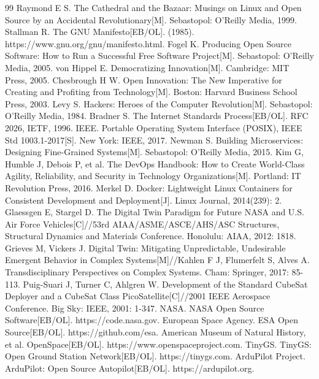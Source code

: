 \documentclass[UTF8,a4paper,zihao=-4]{ctexart}
\begin{document}
\begin{thebibliography}{99}
 Raymond E S. The Cathedral and the Bazaar: Musings on Linux and Open Source by an Accidental Revolutionary[M]. Sebastopol: O'Reilly Media, 1999.
 Stallman R. The GNU Manifesto[EB/OL]. (1985). https://www.gnu.org/gnu/manifesto.html.
 Fogel K. Producing Open Source Software: How to Run a Successful Free Software Project[M]. Sebastopol: O'Reilly Media, 2005.
 von Hippel E. Democratizing Innovation[M]. Cambridge: MIT Press, 2005.
 Chesbrough H W. Open Innovation: The New Imperative for Creating and Profiting from Technology[M]. Boston: Harvard Business School Press, 2003.
 Levy S. Hackers: Heroes of the Computer Revolution[M]. Sebastopol: O'Reilly Media, 1984.
 Bradner S. The Internet Standards Process[EB/OL]. RFC 2026, IETF, 1996.
 IEEE. Portable Operating System Interface (POSIX), IEEE Std 1003.1-2017[S]. New York: IEEE, 2017.
 Newman S. Building Microservices: Designing Fine-Grained Systems[M]. Sebastopol: O'Reilly Media, 2015.
 Kim G, Humble J, Debois P, et al. The DevOps Handbook: How to Create World-Class Agility, Reliability, and Security in Technology Organizations[M]. Portland: IT Revolution Press, 2016.
 Merkel D. Docker: Lightweight Linux Containers for Consistent Development and Deployment[J]. Linux Journal, 2014(239): 2.
 Glaessgen E, Stargel D. The Digital Twin Paradigm for Future NASA and U.S. Air Force Vehicles[C]//53rd AIAA/ASME/ASCE/AHS/ASC Structures, Structural Dynamics and Materials Conference. Honolulu: AIAA, 2012: 1818.
 Grieves M, Vickers J. Digital Twin: Mitigating Unpredictable, Undesirable Emergent Behavior in Complex Systems[M]//Kahlen F J, Flumerfelt S, Alves A. Transdisciplinary Perspectives on Complex Systems. Cham: Springer, 2017: 85-113.
 Puig-Suari J, Turner C, Ahlgren W. Development of the Standard CubeSat Deployer and a CubeSat Class PicoSatellite[C]//2001 IEEE Aerospace Conference. Big Sky: IEEE, 2001: 1-347.
 NASA. NASA Open Source Software[EB/OL]. https://code.nasa.gov.
 European Space Agency. ESA Open Source[EB/OL]. https://github.com/esa.
 American Museum of Natural History, et al. OpenSpace[EB/OL]. https://www.openspaceproject.com.
 TinyGS. TinyGS: Open Ground Station Network[EB/OL]. https://tinygs.com.
 ArduPilot Project. ArduPilot: Open Source Autopilot[EB/OL]. https://ardupilot.org.

\end{thebibliography}
\end{document}
